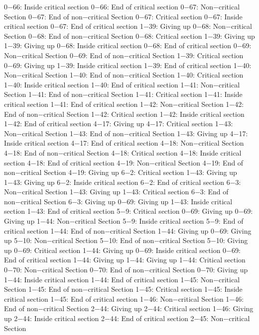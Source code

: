 0−66: Inside critical section
0−66: End of critical section
0−67: Non−critical Section
0−67: End of non−critical Section
0−67: Critical section
0−67: Inside critical section
0−67: End of critical section
1−39: Giving up
0−68: Non−critical Section
0−68: End of non−critical Section
0−68: Critical section
1−39: Giving up
1−39: Giving up
0−68: Inside critical section
0−68: End of critical section
0−69: Non−critical Section
0−69: End of non−critical Section
1−39: Critical section
0−69: Giving up
1−39: Inside critical section
1−39: End of critical section
1−40: Non−critical Section
1−40: End of non−critical Section
1−40: Critical section
1−40: Inside critical section
1−40: End of critical section
1−41: Non−critical Section
1−41: End of non−critical Section
1−41: Critical section
1−41: Inside critical section
1−41: End of critical section
1−42: Non−critical Section
1−42: End of non−critical Section
1−42: Critical section
1−42: Inside critical section
1−42: End of critical section
4−17: Giving up
4−17: Critical section
1−43: Non−critical Section
1−43: End of non−critical Section
1−43: Giving up
4−17: Inside critical section
4−17: End of critical section
4−18: Non−critical Section
4−18: End of non−critical Section
4−18: Critical section
4−18: Inside critical section
4−18: End of critical section
4−19: Non−critical Section
4−19: End of non−critical Section
4−19: Giving up
6−2: Critical section
1−43: Giving up
1−43: Giving up
6−2: Inside critical section
6−2: End of critical section
6−3: Non−critical Section
1−43: Giving up
1−43: Critical section
6−3: End of non−critical Section
6−3: Giving up
0−69: Giving up
1−43: Inside critical section
1−43: End of critical section
5−9: Critical section
0−69: Giving up
0−69: Giving up
1−44: Non−critical Section
5−9: Inside critical section
5−9: End of critical section
1−44: End of non−critical Section
1−44: Giving up
0−69: Giving up
5−10: Non−critical Section
5−10: End of non−critical Section
5−10: Giving up
0−69: Critical section
1−44: Giving up
0−69: Inside critical section
0−69: End of critical section
1−44: Giving up
1−44: Giving up
1−44: Critical section
0−70: Non−critical Section
0−70: End of non−critical Section
0−70: Giving up
1−44: Inside critical section
1−44: End of critical section
1−45: Non−critical Section
1−45: End of non−critical Section
1−45: Critical section
1−45: Inside critical section
1−45: End of critical section
1−46: Non−critical Section
1−46: End of non−critical Section
2−44: Giving up
2−44: Critical section
1−46: Giving up
2−44: Inside critical section
2−44: End of critical section
2−45: Non−critical Section
